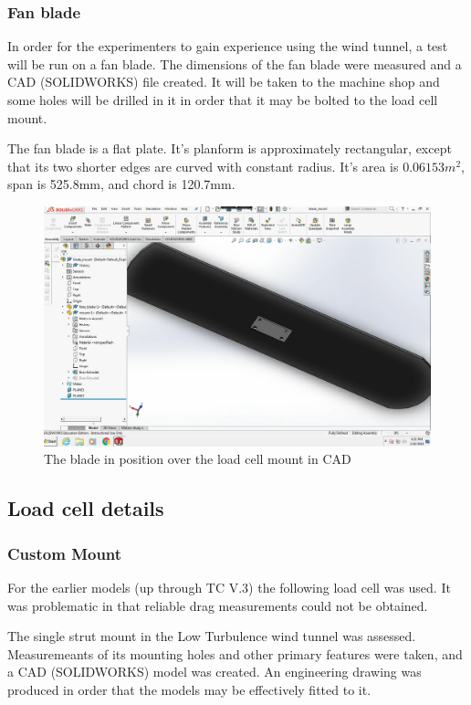 \documentclass[12pt]{report} %
\begin{document}
\subsubsection{Fan blade}
In order for the experimenters to gain experience using the wind tunnel, a test will be run on a fan blade.  The dimensions of the fan blade
were measured
and a CAD (SOLIDWORKS) file created.  It will be taken to the machine shop and some holes will be drilled in it in order that it may be
bolted to the load cell mount.

The fan blade is a flat plate.  It's planform is approximately rectangular, except that its two shorter edges are curved with constant
radius.  It's area is $0.06153m^2$, span is 525.8mm, and chord is 120.7mm.

\begin{figure}
\includegraphics[width = 15cm]{blade_CAD.png}
\caption{The blade in position over the load cell mount in CAD}
\end{figure}

\subsection{Load cell details}

\subsubsection{Custom Mount}

For the earlier models (up through TC V.3) the following load cell was used. It was problematic in that reliable drag measurements
could not be obtained.

The single strut mount in the Low Turbulence wind tunnel was assessed.  Measuremeants of its mounting holes and other primary features
were taken, and a CAD (SOLIDWORKS) model was created.  An engineering drawing was produced in order that the models may be effectively
fitted to it.
\end{document}
